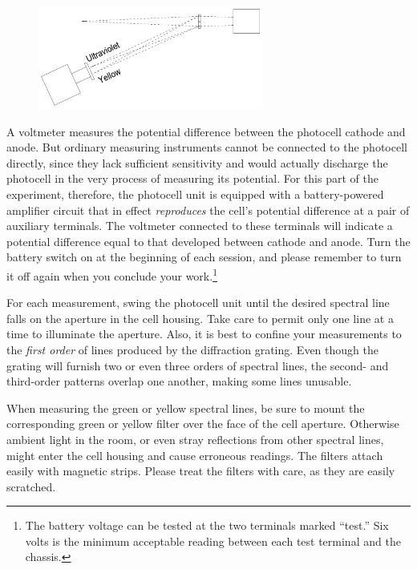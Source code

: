 \begin{figure}[h]
  \begin{center}
  \includegraphics[width=2.91667in,height=1.33333in]{images/06_einstein/005.png}
  \end{center}
\end{figure}


A voltmeter measures the potential difference between the photocell
cathode and anode. But ordinary measuring instruments cannot be
connected to the photocell directly, since they lack sufficient
sensitivity and would actually discharge the photocell in the very
process of measuring its potential. For this part of the experiment,
therefore, the photocell unit is equipped with a battery-powered
amplifier circuit that in effect \emph{reproduces} the cell's potential
difference at a pair of auxiliary terminals. The voltmeter connected to
these terminals will indicate a potential difference equal to that
developed between cathode and anode. Turn the battery switch on at the
beginning of each session, and please remember to turn it off again when
you conclude your work.\footnote{The battery voltage can be tested at
  the two terminals marked ``test.'' Six volts is the minimum acceptable
  reading between each test terminal and the chassis.}

For each measurement, swing the photocell unit until the desired
spectral line falls on the aperture in the cell housing. Take care to
permit only one line at a time to illuminate the aperture. Also, it is
best to confine your measurements to the \emph{first order} of lines
produced by the diffraction grating. Even though the grating will
furnish two or even three orders of spectral lines, the second- and
third-order patterns overlap one another, making some lines unusable.

When measuring the green or yellow spectral lines, be sure to mount the
corresponding green or yellow filter over the face of the cell aperture.
Otherwise ambient light in the room, or even stray reflections from
other spectral lines, might enter the cell housing and cause erroneous
readings. The filters attach easily with magnetic strips. Please treat
the filters with care, as they are easily scratched.

